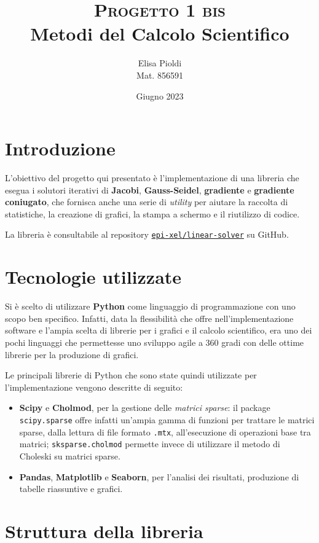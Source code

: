 \documentclass[12pt]{article}
\title{\textbf{\textsc{Progetto 1 bis}}\\Metodi del Calcolo Scientifico}
\author{Elisa Pioldi\\
        Mat. 856591}
\date{Giugno 2023}
\begin{document}
\maketitle

\section{Introduzione}

L'obiettivo del progetto qui presentato è l'implementazione di una libreria che esegua i solutori iterativi di \textbf{Jacobi}, \textbf{Gauss-Seidel}, \textbf{gradiente} e \textbf{gradiente coniugato}, che fornisca anche una serie di \textit{utility} per aiutare la raccolta di statistiche, la creazione di grafici, la stampa a schermo e il riutilizzo di codice.

La libreria è consultabile al repository \href{https://github.com/epi-xel/linear-solver}{\texttt{epi-xel/linear-solver}} su GitHub.

\section{Tecnologie utilizzate}

Si è scelto di utilizzare \textbf{Python} come linguaggio di programmazione con uno scopo ben specifico. Infatti, data la flessibilità che offre nell'implementazione software e l'ampia scelta di librerie per i grafici e il calcolo scientifico, era uno dei pochi linguaggi che permettesse uno sviluppo agile a 360 gradi con delle ottime librerie per la produzione di grafici.

Le principali librerie di Python che sono state quindi utilizzate per l'implementazione vengono descritte di seguito:
\begin{itemize}
    \item \textbf{Scipy} e \textbf{Cholmod}, per la gestione delle \textit{matrici sparse}: il package \texttt{scipy.sparse} offre infatti un'ampia gamma di funzioni per trattare le matrici sparse, dalla lettura di file formato \texttt{.mtx}, all'esecuzione di operazioni base tra matrici; \texttt{sksparse.cholmod} permette invece di utilizzare il metodo di Choleski su matrici sparse.
    \item \textbf{Pandas}, \textbf{Matplotlib} e \textbf{Seaborn}, per l'analisi dei risultati, produzione di tabelle riassuntive e grafici.
\end{itemize}

\section{Struttura della libreria}
\end{document}
